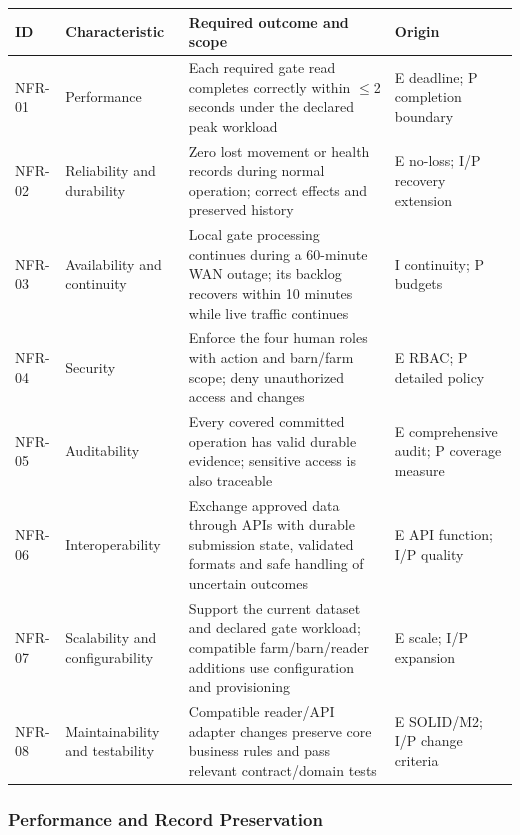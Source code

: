 {\small
\begin{longtable}[]{|>{\raggedright\arraybackslash}p{}|>{\raggedright\arraybackslash}p{}|>{\raggedright\arraybackslash}p{}|>{\raggedright\arraybackslash}p{}|}
\hline
\textbf{ID} & \textbf{Characteristic} & \textbf{Required outcome and scope} & \textbf{Origin} \\ \hline
\endhead
NFR-01 & Performance & Each required gate read completes correctly
within \(\leq\)2 seconds under the declared peak workload & E
deadline; P completion boundary \\ \hline
NFR-02 & Reliability and durability & Zero lost movement or health
records during normal operation; correct effects and preserved history &
E no-loss; I/P recovery extension \\ \hline
NFR-03 & Availability and continuity & Local gate processing continues
during a 60-minute WAN outage; its backlog recovers within 10
minutes while live traffic continues & I continuity; P budgets \\ \hline
NFR-04 & Security & Enforce the four human roles with action and
barn/farm scope; deny unauthorized access and changes & E RBAC; P
detailed policy \\ \hline
NFR-05 & Auditability & Every covered committed operation has valid
durable evidence; sensitive access is also traceable & E comprehensive
audit; P coverage measure \\ \hline
NFR-06 & Interoperability & Exchange approved data through APIs with
durable submission state, validated formats and safe handling of
uncertain outcomes & E API function; I/P quality \\ \hline
NFR-07 & Scalability and configurability & Support the current dataset
and declared gate workload; compatible farm/barn/reader additions use
configuration and provisioning & E scale; I/P expansion \\ \hline
NFR-08 & Maintainability and testability & Compatible reader/API adapter
changes preserve core business rules and pass relevant contract/domain
tests & E SOLID/M2; I/P change criteria \\ \hline
\end{longtable}
}

\subsubsection{Performance and Record Preservation}\label{sec:2.2.1}

